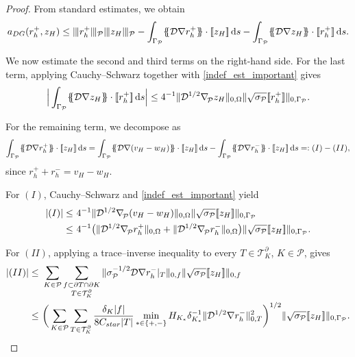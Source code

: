 \documentclass[10pt,a4paper]{amsart}
\newcommand\calP{{\mathcal{P}}}
\newcommand\calT{{\mathcal{T}}}
\newcommand{\bnabla}{\nabla_{\kern-.05cm\mesh}^{}}
\newcommand{\jump}[1]{[\![#1]\!]}                        %
\newcommand{\mean}[1]{\{\kern-1.1mm\{#1\}\kern-1.1mm\}}
\newcommand{\mesh}{\calP}
\newcommand{\ndgp}[1]{| \kern -.25mm \|{#1}| \kern -.25mm \|_{\rm \mesh}}
\newcommand{\norm}[2]{\|{#1}\|_{{#2}}}
\newcommand{\ud}{\,\mathrm{d}}
\renewcommand{\k}{K}
\begin{document}
\begin{proof}
From standard estimates, we obtain
\begin{equation}\label{cont_one}
a_{DG}(r_h^+, z_H) \le \ndgp{r_h^+}\ndgp{z_H}
-	\int_{\Gamma_{\calP}}\mean{\mathcal{D}\nabla r_h^+}\cdot\jump{z_H}\ud s
-	\int_{\Gamma_{\calP}}\mean{\mathcal{D}\nabla z_H}\cdot\jump{r_h^+}\ud s.
\end{equation}

We now estimate the second and third terms on the right-hand side.  
For the last term, applying Cauchy--Schwarz together with
\eqref{indef_est_important} gives
\begin{equation}\label{indef_easy}
\Big|\int_{\Gamma_{\calP}}\mean{\mathcal{D}\nabla z_H}\cdot\jump{r_h^+}\ud s\Big|
\le 
4^{-1}\norm{\mathcal{D}^{1/2}\bnabla z_H}{0,\Omega}
\norm{\sqrt{\sigma_\calP}\jump{r_h^+}}{0,\Gamma_{\calP}}.
\end{equation}

For the remaining term, we decompose as
\begin{equation}\label{indef_cool}
\int_{\Gamma_{\calP}}\mean{\mathcal{D}\nabla r_h^+}\cdot\jump{z_H}\ud s
= \int_{\Gamma_{\calP}}\mean{\mathcal{D}\nabla (v_H-w_H)}\cdot\jump{z_H}\ud s
-\int_{\Gamma_{\calP}}\mean{\mathcal{D}\nabla r_h^-}\cdot\jump{z_H}\ud s
=:(I)-(II),
\end{equation}
since $r_h^++r_h^-=v_H-w_H$.

For $(I)$, Cauchy--Schwarz and \eqref{indef_est_important} yield
\[
\begin{aligned}
|(I)|
\le&\ 
4^{-1}\norm{\mathcal{D}^{1/2}\bnabla (v_H-w_H)}{0,\Omega}
\norm{\sqrt{\sigma_\calP}\jump{z_H}}{0,\Gamma_{\calP}}\\
\le&\
4^{-1}\big(\norm{\mathcal{D}^{1/2}\bnabla r_h^+}{0,\Omega}
+\norm{\mathcal{D}^{1/2}\bnabla r_h^-}{0,\Omega}\big)
\norm{\sqrt{\sigma_\calP}\jump{z_H}}{0,\Gamma_{\calP}}.
\end{aligned}
\]

For $(II)$, applying a trace--inverse inequality to every
$T\in\calT_\k^\partial$, $\k\in\mesh$, gives
\[
\begin{aligned}
|(II)|\le&\
\sum_{\k\in\mesh}\sum_{\substack{f\subset \partial T\cap\partial K\\ T\in \mathcal{T}_\k^\partial}}
\norm{\sigma_\calP^{-1/2}\mathcal{D}\nabla r_h^-|_T}{0,f}
\norm{\sqrt{\sigma_\calP}\jump{z_H}}{0,f}\\
\le&\
\bigg(\sum_{\k\in\mesh}\sum_{\substack{T\in \mathcal{T}_\k^\partial}}
\frac{\delta_{\k}|f|}{8C_{\rm star}|T|}
\min_{*\in\{+,-\}}H_{\k_*}\delta_{\k_*}^{-1}
\norm{\mathcal{D}^{1/2}\nabla r_h^-}{0,T}^2\bigg)^{1/2}
\norm{\sqrt{\sigma_\calP}\jump{z_H}}{0,\Gamma_{\calP}}.
\end{aligned}
\]


\end{proof}
\end{document}
